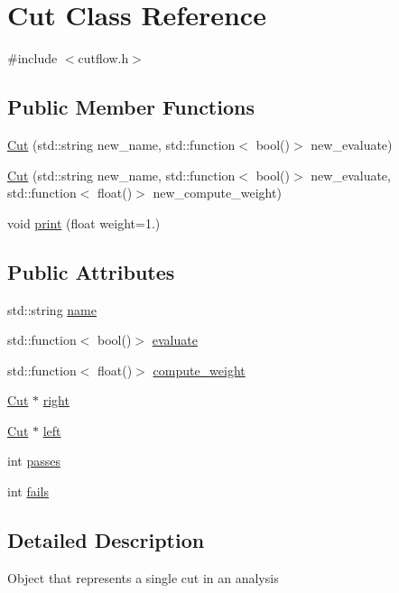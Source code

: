 \hypertarget{classCut}{}\section{Cut Class Reference}
\label{classCut}


{\ttfamily \#include $<$cutflow.\+h$>$}

\subsection*{Public Member Functions}
\begin{DoxyCompactItemize}
\item 
\hyperlink{classCut_aaa89435c5326080296041bc38937ab2d}{Cut} (std\+::string new\+\_\+name, std\+::function$<$ bool()$>$ new\+\_\+evaluate)
\item 
\hyperlink{classCut_adcfec6d2df97f8e84058078f2f736b03}{Cut} (std\+::string new\+\_\+name, std\+::function$<$ bool()$>$ new\+\_\+evaluate, std\+::function$<$ float()$>$ new\+\_\+compute\+\_\+weight)
\item 
void \hyperlink{classCut_af05a93abb03377951fb2e7da79a7e5df}{print} (float weight=1.)
\end{DoxyCompactItemize}
\subsection*{Public Attributes}
\begin{DoxyCompactItemize}
\item 
std\+::string \hyperlink{classCut_accf700d2d00746b97a265d4aea3f55c2}{name}
\item 
std\+::function$<$ bool()$>$ \hyperlink{classCut_a4205ad5e62b859536797141f3ace2253}{evaluate}
\item 
std\+::function$<$ float()$>$ \hyperlink{classCut_a908dfdeed9d882ca026427c0942fb999}{compute\+\_\+weight}
\item 
\hyperlink{classCut}{Cut} $\ast$ \hyperlink{classCut_a2142ffe68028bb0c211408c0f5bb8bfb}{right}
\item 
\hyperlink{classCut}{Cut} $\ast$ \hyperlink{classCut_a2c65e372172dfa0f705d117d3ad0f668}{left}
\item 
int \hyperlink{classCut_a9ec802667c770787a473c622208ef35c}{passes}
\item 
int \hyperlink{classCut_a7bfcec46b8c2879a9660ac7656ed7b83}{fails}
\end{DoxyCompactItemize}


\subsection{Detailed Description}
Object that represents a single cut in an analysis 

